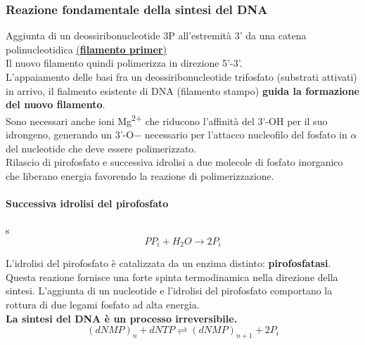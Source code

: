 \documentclass{article}
\begin{document}
\subsubsection{Reazione fondamentale della sintesi del DNA} Aggiunta di un deossiribonucleotide 3P all'estremità 3' da una catena polinucleotidica \underline{(\textbf{filamento primer})}\\ Il nuovo filamento quindi polimerizza in direzione 5'-3'.\\L'appaiamento delle basi fra un deossiribonucleotide trifosfato (substrati attivati) in arrivo, il fialmento esistente di DNA (filamento stampo) \textbf{guida la formazione del nuovo filamento}.\\Sono necessari anche ioni Mg\textsuperscript{2+} che riducono l'affinità del 3'-OH per il suo idrongeno, generando un 3'-O$-$ necessario per l'attacco nucleofilo del fosfato in $ \alpha $ del nucleotide che deve essere polimerizzato.\\ Rilascio di pirofosfato e successiva idrolisi a due molecole di fosfato inorganico che liberano energia favorendo la reazione di polimerizzazione.
\paragraph{Successiva idrolisi del pirofosfato} 
s
$$ PP_{i}+ H_2O \rightarrow 2P_{i} $$ 

L'idrolisi del pirofosfato è catalizzata da un enzima distinto: \textbf{pirofosfatasi}.\\ Questa reazione fornisce una forte spinta termodinamica nella direzione della sintesi. L'aggiunta di un nucleotide e l'idrolisi del pirofosfato comportano la rottura di due legami fosfato ad alta energia.\\ \textbf{La sintesi del DNA è un processo irreversibile.}\\
   $$ (dNMP)_{n} + dNTP \rightleftharpoons (dNMP)_{n+1}+ 2P_{i}$$ 
\end{document}
